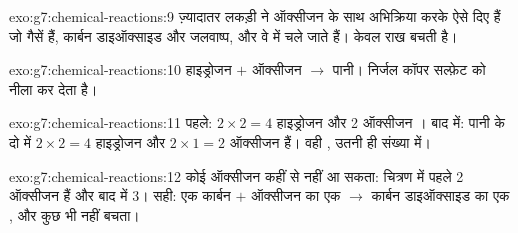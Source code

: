 \begin{solution}{exo:g7:chemical-reactions:9}
ज़्यादातर लकड़ी ने ऑक्सीजन के साथ अभिक्रिया करके ऐसे  दिए हैं जो गैसें
हैं, कार्बन डाइऑक्साइड और जलवाष्प, और वे  में चले जाते हैं। केवल
राख बचती है।
\end{solution}

\begin{solution}{exo:g7:chemical-reactions:10}
हाइड्रोजन $+$ ऑक्सीजन $\longrightarrow$ पानी।  निर्जल
कॉपर सल्फ़ेट को नीला कर देता है।
\end{solution}

\begin{solution}{exo:g7:chemical-reactions:11}
पहले: $2 \times 2 = 4$ हाइड्रोजन  और 2 ऑक्सीजन । बाद में: पानी
के दो  में $2 \times 2 = 4$ हाइड्रोजन  और $2 \times 1 =
2$ ऑक्सीजन  हैं। वही , उतनी ही संख्या में।
\end{solution}

\begin{solution}{exo:g7:chemical-reactions:12}
कोई ऑक्सीजन  कहीं से नहीं आ सकता: चित्रण में पहले 2 ऑक्सीजन 
हैं और बाद में 3। सही: एक कार्बन  $+$ ऑक्सीजन का एक 
$\longrightarrow$ कार्बन डाइऑक्साइड का एक , और कुछ भी नहीं बचता।
\end{solution}

